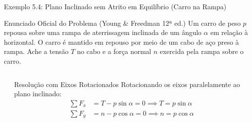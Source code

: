 \documentclass[10pt,aspectratio=169]{beamer}
\begin{document}
\begin{frame}{Exemplo 5.4: Plano Inclinado sem Atrito em Equilíbrio (Carro na Rampa)}
    \begin{block}{Enunciado Oficial do Problema (Young \& Freedman 12ª ed.)}
        \small
        Um carro de peso $p$ repousa sobre uma rampa de aterrissagem inclinada de um ângulo $\alpha$ em relação à horizontal. O carro é mantido em repouso por meio de um cabo de aço preso à rampa. Ache a tensão $T$ no cabo e a força normal $n$ exercida pela rampa sobre o carro.
    \end{block}
    \begin{columns}[T]
        \begin{center}
        \end{center}
        \begin{exampleblock}{Resolução com Eixos Rotacionados}
            \small
            Rotacionando os eixos paralelamente ao plano inclinado:
            \begin{align*}
                \sum F_x &= T - p \sin\alpha = 0 \implies T = p \sin\alpha \\
                \sum F_y &= n - p \cos\alpha = 0 \implies n = p \cos\alpha
            \end{align*}
        \end{exampleblock}
    \end{columns}
\end{frame}
\end{document}
